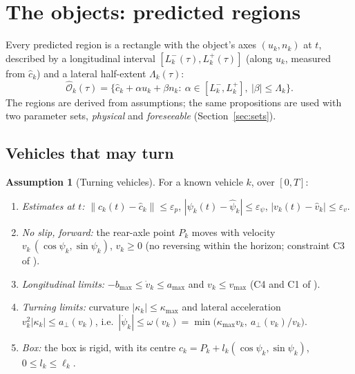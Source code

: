 \documentclass[11pt]{article}
\theoremstyle{definition}
\newtheorem{assumption}{Assumption}
\theoremstyle{remark}
\newcommand{\Ohat}{\widehat{\mathcal{O}}}
\begin{document}
\section{The objects: predicted regions}\label{sec:objects}

Every predicted region is a rectangle with the object's axes $(u_k,n_k)$ at $t$, described by a
longitudinal interval $[L_k^-(\tau),L_k^+(\tau)]$ (along $u_k$, measured from $\hat c_k$) and a lateral
half-extent $\Lambda_k(\tau)$:
\[
\Ohat_k(\tau)=\Big\{\hat c_k+\alpha u_k+\beta n_k:\ \alpha\in[L_k^-,L_k^+],\ |\beta|\le\Lambda_k\Big\}.
\]
The regions are derived from assumptions; the same propositions are used with two parameter sets,
\emph{physical} and \emph{foreseeable} (Section~\ref{sec:sets}).

\subsection{Vehicles that may turn}
\begin{assumption}[Turning vehicles]\label{ass:veh}
For a known vehicle $k$, over $[0,T]$:
\begin{enumerate}[label=(V\arabic*),leftmargin=*]
  \item \emph{Estimates at $t$:} $\|c_k(t)-\hat c_k\|\le\varepsilon_p$, $|\psi_k(t)-\hat\psi_k|\le\varepsilon_\psi$,
    $|v_k(t)-\hat v_k|\le\varepsilon_v$.
  \item \emph{No slip, forward:} the rear-axle point $P_k$ moves with velocity $v_k\,(\cos\psi_k,\sin\psi_k)$,
    $v_k\ge0$ (no reversing within the horizon; constraint C3 of \cite{althoff2016}).
  \item \emph{Longitudinal limits:} $-b_{\max}\le\dot v_k\le a_{\max}$ and $v_k\le v_{\max}$ (C4 and C1 of
    \cite{althoff2016}).
  \item \emph{Turning limits:} curvature $|\kappa_k|\le\kappa_{\max}$ and lateral acceleration
    $v_k^2|\kappa_k|\le a_\perp(v_k)$, i.e.\ $|\dot\psi_k|\le\omega(v_k)=\min\big(\kappa_{\max}v_k,\ a_\perp(v_k)/v_k\big)$.
  \item \emph{Box:} the box is rigid, with its centre $c_k=P_k+l_k(\cos\psi_k,\sin\psi_k)$, $0\le l_k\le\ell_k$.
\end{enumerate}
\end{assumption}
\end{document}
